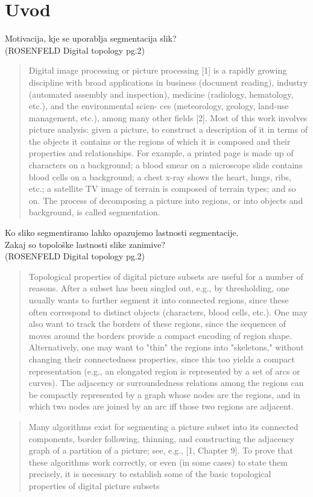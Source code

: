 \documentclass[a4paper, 12pt]{book}
\begin{document}
\chapter{Uvod}
Motivacija, kje se uporablja segmentacija slik?\\
(ROSENFELD Digital topology pg.2) 
\begin{quote}
  
  Digital image processing or picture processing [1] is a rapidly growing discipline with broad applications in business (document reading), industry (automated assembly and inspection), medicine (radiology, hematology, etc.), and the environmental scien- ces (meteorology, geology, land-use management, etc.), among many other fields [2]. Most of this work involves picture analysis: given a picture, to construct a description of it in terms of the objects it contains or the regions of which it is composed and their properties and relationships. For example, a printed page is made up of characters on a background; a blood smear on a microscope slide contains blood cells on a background; a chest x-ray shows the heart, lungs, ribs, etc.; a satellite TV image of terrain is composed of terrain types; and so on. The process of decomposing a picture into regions, or into objects and background, is called segmentation.
\end{quote}
Ko sliko segmentiramo lahko opazujemo lastnosti segmentacije.\\
Zakaj so topološke lastnosti slike zanimive?\\
(ROSENFELD Digital topology pg.2) 
\begin{quote}
  Topological properties of digital picture subsets are useful for a number of reasons. After a subset has been singled out, e.g., by thresholding, one usually wants to further segment it into connected regions, since these often correspond to distinct objects (characters, blood cells, etc.). One may also want to track the borders of these regions, since the sequences of moves around the borders provide a compact encoding of region shape. Alternatively, one may want to "thin" the regions into "skeletons," without changing their connectedness properties, since this too yields a compact representation (e.g., an elongated region is represented by a set of arcs or curves). The adjacency or surroundedness relations among the regions can be compactly represented by a graph whose nodes are the regions, and in which two nodes are joined by an arc iff those two regions are adjacent.
\end{quote}
\begin{quote}
  Many algorithms exist for segmenting a picture subset into its connected components, border following, thinning, and constructing the adjacency graph of a partition of a picture; see, e.g., [1, Chapter 9]. To prove that these algorithms work correctly, or even (in some cases) to state them precisely, it is necessary to establish some of the basic topological properties of digital picture subsets
\end{quote}
\end{document}

